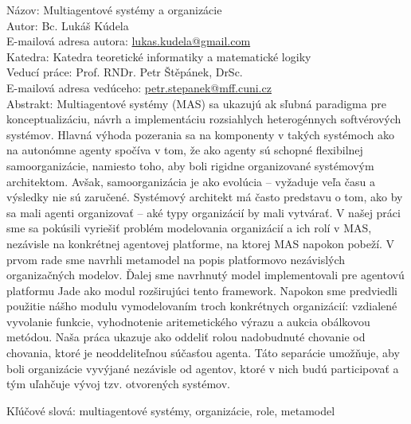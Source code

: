 
\frenchspacing

Názov: Multiagentové systémy a organizácie\\
Autor: Bc. Lukáš Kúdela\\
E-mailová adresa autora: \url{lukas.kudela@gmail.com}\\
Katedra: Katedra teoretické informatiky a matematické logiky\\
Veducí práce: Prof. RNDr. Petr Štěpánek, DrSc.\\
E-mailová adresa vedúceho: \url{petr.stepanek@mff.cuni.cz}\\

Abstrakt: Multiagentové systémy (MAS) sa ukazujú ak sľubná paradigma pre konceptualizáciu, návrh a implementáciu rozsiahlych heterogénnych softvérových systémov.
Hlavná výhoda pozerania sa na komponenty v takých systémoch ako na autonómne agenty spočíva v tom, že ako agenty sú schopné flexibilnej samoorganizácie, namiesto toho, aby boli rigidne organizované systémovým architektom.
Avšak, samoorganizácia je ako evolúcia -- vyžaduje veľa času a výsledky nie sú zaručené.
Systémový architekt má často predstavu o tom, ako by sa mali agenti organizovať -- aké typy organizácií by mali vytvárať.
V našej práci sme sa pokúsili vyriešiť problém modelovania organizácií a ich rolí v MAS, nezávisle na konkrétnej agentovej platforme, na ktorej MAS napokon pobeží.
V prvom rade sme navrhli metamodel na popis platformovo nezávislých organizačných modelov.
Ďalej sme navrhnutý model implementovali pre agentovú platformu Jade ako modul rozširujúci tento framework.
Napokon sme predviedli použitie nášho modulu vymodelovaním troch konkrétnych organizácií: vzdialené vyvolanie funkcie, vyhodnotenie aritemetického výrazu a aukcia obálkovou metódou. 
Naša práca ukazuje ako oddeliť rolou nadobudnuté chovanie od chovania, ktoré je neoddeliteľnou súčasťou agenta.
Táto separácie umožňuje, aby boli organizácie vyvýjané nezávisle od agentov, ktoré v nich budú participovať a tým uľahčuje vývoj tzv. otvorených systémov.

Kľúčové slová: multiagentové systémy, organizácie, role, metamodel

\nonfrenchspacing